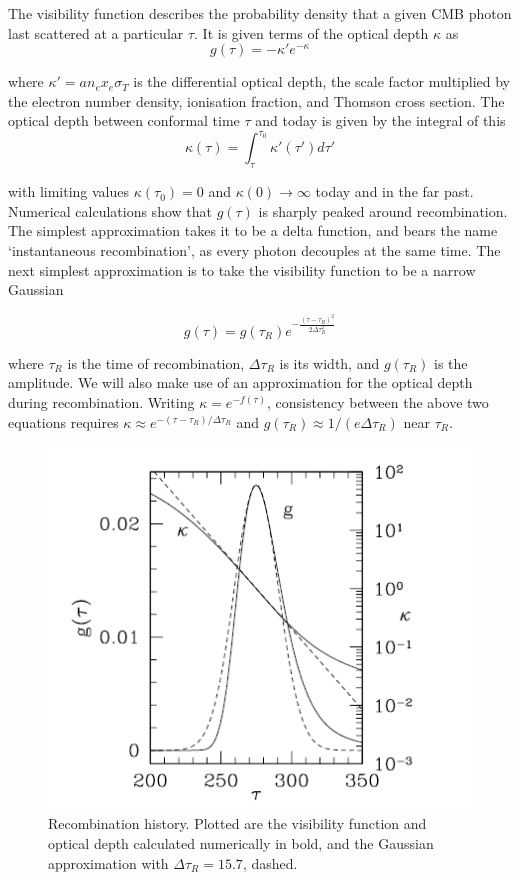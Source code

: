 \documentclass[a4paper,10pt]{article}
\begin{document}
The visibility function describes the probability density that a given CMB photon last scattered at a particular $\tau$. It is given terms of the optical depth $\kappa$ as
\begin{equation}
g(\tau) = -\kappa'e^{-\kappa}
\end{equation}

where $\kappa' = an_ex_e\sigma_T$ is the differential optical depth, the scale factor multiplied by the electron number density, ionisation fraction, and Thomson cross section. The optical depth between conformal time $\tau$ and today is given by the integral of this 
\begin{equation}
\kappa(\tau) = \int_\tau^{\tau_0} \kappa'(\tau')d\tau'
\end{equation}

with limiting values $\kappa(\tau_0) = 0$ and $\kappa(0)\rightarrow \infty$ today and in the far past. Numerical calculations show that $g(\tau)$ is sharply peaked around recombination. The simplest approximation takes it to be a delta function, and bears the name `instantaneous recombination', as every photon decouples at the same time. The next simplest approximation is to take the visibility function to be a narrow Gaussian

\begin{equation}
g(\tau) = g(\tau_R)e^{-\frac{(\tau-\tau_R)^2}{2\Delta\tau_R^2}}
\end{equation}

where $\tau_R$ is the time of recombination, $\Delta\tau_R$ is its width, and $g(\tau_R)$ is the amplitude. We will also make use of an approximation for the optical depth during recombination. Writing $\kappa = e^{-f(\tau)}$, consistency between the above two equations requires $\kappa \approx e^{-(\tau-\tau_R) / \Delta\tau_R}$ and $g(\tau_R)\approx 1/(e\Delta\tau_R)$ near $\tau_R$. 

\begin{figure}[h]
  \includegraphics[width=0.5\linewidth]{recombinationhistory.png}
  \centering
  \caption{Recombination history. Plotted are the visibility function and optical depth calculated numerically in bold, and the Gaussian approximation with $\Delta\tau_R=15.7$, dashed. }
\end{figure}
\end{document}
